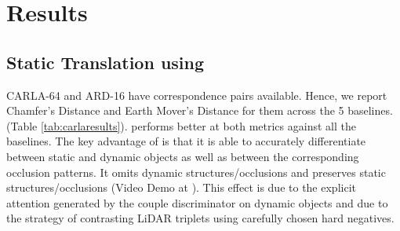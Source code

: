 \section{Results}
\subsection{
Static Translation using \dslr{}}
\label{sec:chamfer-nu}
CARLA-64 and ARD-16 have correspondence pairs available.
Hence, we report Chamfer's Distance and Earth Mover's Distance for them across the 5 baselines. (Table \ref{tab:carlaresults}). \dslr{}
performs better at both metrics against all the baselines.
The key advantage of \dslr{} is that it is able to accurately differentiate between static and dynamic objects as well as between the corresponding occlusion patterns. It omits dynamic structures/occlusions and preserves static structures/occlusions (Video Demo at \cite{url1}). This effect is due to the explicit attention generated by the couple discriminator on dynamic objects and due to the strategy of contrasting LiDAR triplets using carefully chosen hard negatives. 
\setlength{\tabcolsep}{1.5pt}

